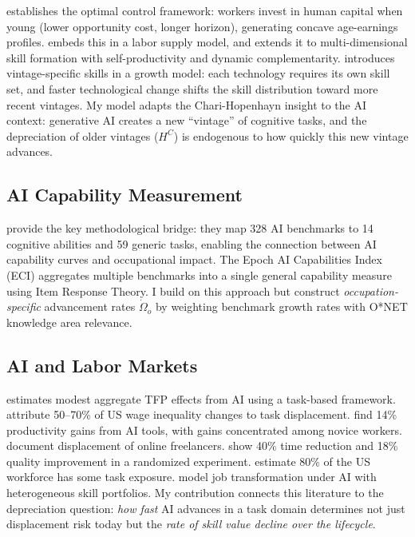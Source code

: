 \documentclass[11pt,a4paper]{article}
\theoremstyle{definition}
\begin{document}
\citet{benporath1967production} establishes the optimal control framework: workers invest in human capital when young (lower opportunity cost, longer horizon), generating concave age-earnings profiles. \citet{heckman1976lifecycle} embeds this in a labor supply model, and \citet{cunha2007technology} extends it to multi-dimensional skill formation with self-productivity and dynamic complementarity. \citet{chari1991vintage} introduces vintage-specific skills in a growth model: each technology requires its own skill set, and faster technological change shifts the skill distribution toward more recent vintages. My model adapts the Chari-Hopenhayn insight to the AI context: generative AI creates a new ``vintage'' of cognitive tasks, and the depreciation of older vintages ($H^C$) is endogenous to how quickly this new vintage advances.

\subsection{AI Capability Measurement}

\citet{tolan2021measuring} provide the key methodological bridge: they map 328 AI benchmarks to 14 cognitive abilities and 59 generic tasks, enabling the connection between AI capability curves and occupational impact. The Epoch AI Capabilities Index (ECI) \citep{epochai2026} aggregates multiple benchmarks into a single general capability measure using Item Response Theory. I build on this approach but construct \textit{occupation-specific} advancement rates $\dot{\Omega}_o$ by weighting benchmark growth rates with O*NET knowledge area relevance.

\subsection{AI and Labor Markets}

\citet{acemoglu2024simple} estimates modest aggregate TFP effects from AI using a task-based framework. \citet{acemoglu2022tasks} attribute 50--70\% of US wage inequality changes to task displacement. \citet{brynjolfsson2025generative} find 14\% productivity gains from AI tools, with gains concentrated among novice workers. \citet{hui2024shortterm} document displacement of online freelancers. \citet{noy2023experimental} show 40\% time reduction and 18\% quality improvement in a randomized experiment. \citet{eloundou2024gpts} estimate 80\% of the US workforce has some task exposure. \citet{freund2025job} model job transformation under AI with heterogeneous skill portfolios. My contribution connects this literature to the depreciation question: \textit{how fast} AI advances in a task domain determines not just displacement risk today but the \textit{rate of skill value decline over the lifecycle}.
\end{document}
